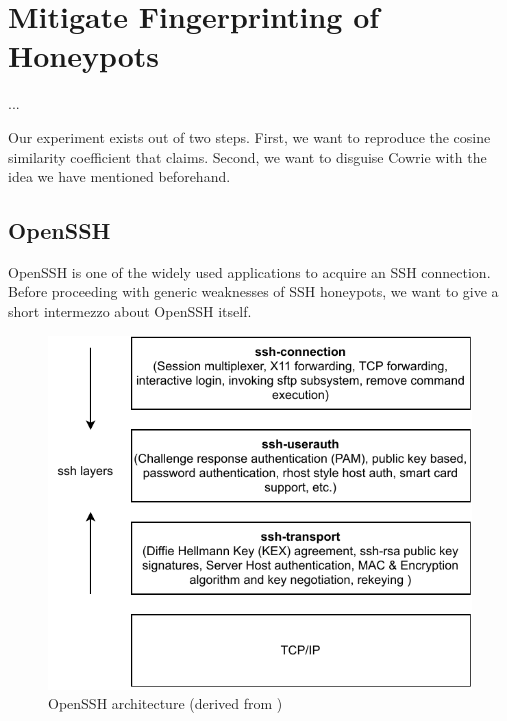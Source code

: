 \chapter{Mitigate Fingerprinting of Honeypots}
\label{chap:fingerprinting}

... %

Our experiment exists out of two steps.
First, we want to reproduce the cosine similarity coefficient that \citet{vetterl2020} claims.
Second, we want to disguise Cowrie with the idea we have mentioned beforehand.

\section{OpenSSH}
\label{sec:openssh}

OpenSSH is one of the widely used applications to acquire an SSH connection.
Before proceeding with generic weaknesses of SSH honeypots, we want to give a short intermezzo about OpenSSH itself.

\begin{figure}[ht]
    \centering
    \includegraphics{figures/openssh-architecture.pdf}
    \caption[OpenSSH architecture]{OpenSSH architecture (derived from \cite{openssh2007})}
    \label{fig:openssh-architecture}
\end{figure}

